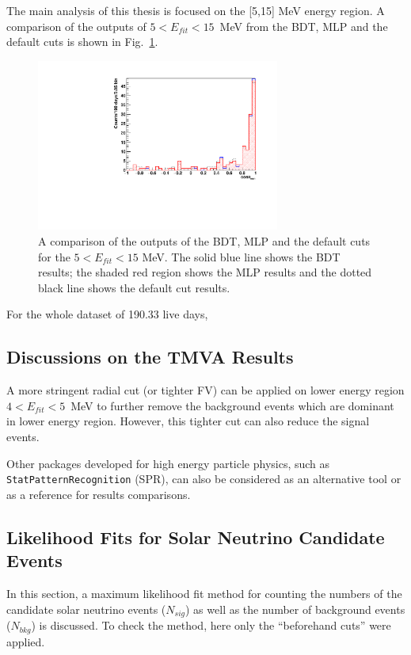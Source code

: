 The main analysis of this thesis is focused on the [5,15] MeV energy region. A comparison of the outputs of $5<E_{fit}<15$~MeV from the BDT, MLP and the default cuts is shown in Fig.~\ref{fig:compare_cosThetaToSun_5to15}.
\begin{figure}[!htb]
	\centering
	\includegraphics[width=8cm]{Compare_cosThetaSun_5to15.pdf}
	\caption[A comparison of the outputs of the BDT, MLP and the default cuts for the $5<E_{fit}<15$ MeV.]{A comparison of the outputs of the BDT, MLP and the default cuts for the $5<E_{fit}<15$ MeV. The solid blue line shows the BDT results; the shaded red region shows the MLP results and the dotted black line shows the default cut results.}
	\label{fig:compare_cosThetaToSun_5to15}
\end{figure}

For the whole dataset of 190.33 live days, 

\subsection{Discussions on the TMVA Results}
A more stringent radial cut (or tighter FV) can be applied on lower energy region $4<E_{fit}<5$~MeV to further remove the background events which are dominant in lower energy region. However, this tighter cut can also reduce the signal events.

Other packages developed for high energy particle physics, such as \texttt{StatPatternRecognition} (SPR)\cite{sprWebsite}, can also be considered as an alternative tool or as a reference for results comparisons. 

\subsection{Likelihood Fits for Solar Neutrino Candidate Events}
In this section, a maximum likelihood fit method for counting the numbers of the candidate solar neutrino events ($N_{sig}$) as well as the number of background events ($N_{bkg}$) is discussed. To check the method, here only the ``beforehand cuts'' were applied. 

